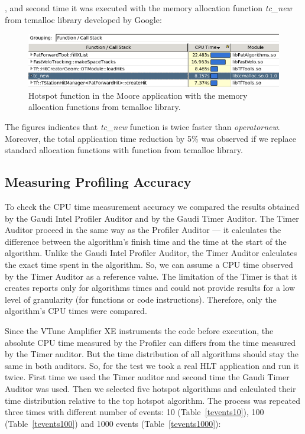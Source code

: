 \documentclass[a4paper]{jpconf}
\begin{document}
, and second time it was executed with the memory allocation function {\it tc\_new} from tcmalloc library 
developed by Google:

\begin{figure}[H]
\begin{minipage}{\textwidth}
\includegraphics[width=\textwidth]{figs/fig11.png}
\caption{\label{fig11}Hotspot function in the Moore application with the memory allocation functions from tcmalloc 
library.}
\end{minipage}
\end{figure}

The figures indicates that {\it tc\_new} function is twice faster than {\it operatornew}. Moreover, the total 
application time reduction by 5\% was observed if we replace standard allocation functions with function 
from tcmalloc library.

\subsection{Measuring Profiling Accuracy}

To check the CPU time measurement accuracy we compared the results obtained by the Gaudi Intel Profiler Auditor 
and by the Gaudi Timer Auditor. The Timer Auditor proceed  in the same way as the Profiler Auditor ---  
it calculates the difference between the algorithm’s finish time and the time at the start of the algorithm. 
Unlike the Gaudi Intel Profiler Auditor, the Timer Auditor calculates the exact time spent in the algorithm. 
So, we can assume a CPU time observed by the Timer Auditor as a reference value. The limitation of the Timer is that 
it creates reports only for algorithms times  and could not provide results for a low level of granularity 
(for functions or code instructions). Therefore, only the algorithm’s CPU times were compared.

Since the VTune Amplifier XE instruments the code before execution, the absolute CPU time measured by the Profiler can 
differs from the time measured by the Timer auditor.  But the time distribution of all algorithms should stay the same 
in both auditors.  So, for the test we took a real HLT application and run it twice. First time we used  
the Timer auditor  and second time the Gaudi Timer Auditor was used. Then we selected five hotspot algorithms and 
calculated their time distribution relative to the top hotspot algorithm. The process was repeated three times with 
different number of events: 10 (Table~\ref{tevents10}), 100 (Table~\ref{tevents100}) and 
1000 events (Table~\ref{tevents1000}): 
\end{document}
